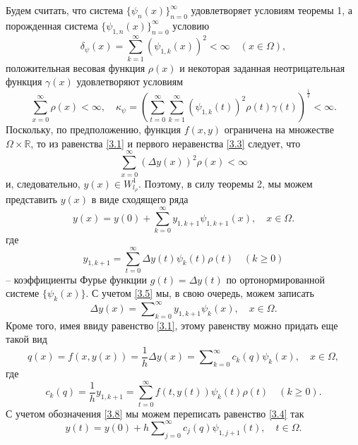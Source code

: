Будем считать, что  система $\{\psi_{n}(x)\}_{n=0}^\infty$ удовлетворяет условиям теоремы 1, а порожденная система $\{\psi_{1,n}(x)\}_{n=0}^\infty$ условию
\begin{equation}\label{3.2}
\delta_\psi(x)=\sum_{k=1}^{\infty}(\psi_{1,k}(x))^2<\infty\quad (x\in \Omega),
\end{equation}
положительная весовая функция $\rho(x)$ и некоторая заданная неотрицательная функция $\gamma(x)$ удовлетворяют  условиям
\begin{equation}\label{3.3}
\sum\limits_{x=0}^\infty\rho(x)<\infty,\quad \kappa_{\psi}=\left(\sum_{t=0}^\infty\sum_{k=1}^{\infty}
(\psi_{1,k}(t))^2\rho(t)\gamma(t)\right)^{\frac12}<\infty.
\end{equation}
  Поскольку, по предположению, функция $f(x,y)$ ограничена на множестве $\Omega\times\mathbb{R}$, то из равенства \eqref{3.1} и первого неравенства \eqref{3.3} следует, что $$\sum_{x=0}^\infty (\Delta y(x))^2\rho(x)<\infty$$  и, следовательно,   $y(x)\in W^1_{l_\rho}$. Поэтому, в силу теоремы 2, мы можем представить $y(x)$ в виде сходящего ряда
\begin{equation}\label{3.4}
y(x)=y(0)+\sum\limits_{k=0}^\infty y_{1,k+1}\psi_{1,k+1}(x),\quad x\in \Omega.
\end{equation}
где
  \begin{equation}\label{3.5}
y_{1,k+1}=\sum_{t=0}^{\infty} \Delta y(t)\psi_{k}(t)\rho(t)\quad(k\ge0)
\end{equation}
-- коэффициенты Фурье функции $g(t)=\Delta y(t)$ по ортонормированной системе $\{\psi_k(x)\}$. С учетом \eqref{3.5} мы, в свою очередь,  можем записать
\begin{equation}\label{3.6}
\Delta y(x)=\sum\nolimits_{k=0}^\infty y_{1,k+1}\psi_{k}(x),\quad x\in \Omega.
\end{equation}
Кроме того, имея ввиду равенство \eqref{3.1}, этому равенству можно придать еще такой вид
\begin{equation}\label{3.7}
q(x)=f(x,y(x))=\frac{1}{h}\Delta y(x)=\sum\nolimits_{k=0}^\infty c_k(q)\psi_{k}(x),\quad x\in \Omega,
\end{equation}
где
\begin{equation}\label{3.8}
c_k(q)=\frac{1}{h}y_{1,k+1}=\sum_{t=0}^{\infty} f(t,y(t))\psi_{k}(t)\rho(t)\quad(k\ge0).
\end{equation}
С учетом обозначения \eqref{3.8} мы можем переписать равенство \eqref{3.4} так
\begin{equation}\label{3.9}
y(t)=y(0)+h\sum\nolimits_{j=0}^\infty c_j(q)\psi_{1,j+1}(t),\quad t\in \Omega.
\end{equation}
